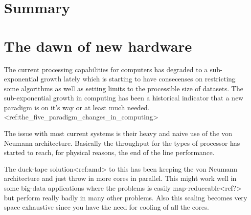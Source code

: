 \documentclass{article}
\begin{document}

%
% 


\section{Summary}

\section{The dawn of new hardware}
    The current processing capabilities for computers has degraded to a
    sub-exponential growth lately which is starting to have consecenses on
    restricting some algorithms as well as setting limits 
    to the processible size of datasets.
    The sub-exponential growth in computing has been a historical indicator
    that a new paradigm is on it's way or at least much
    needed.<ref:the_five_paradigm_changes_in_computing>
    
    The issue with most current systems is their heavy and naive use of the von
    Neumann architecture. Basically the throughput for the types of processor
    has started to reach, for physical reasons, the end of the line 
    performance.

    The duck-tape solution<ref:amd> to this has been keeping the von Neumann
    architecture and just throw in more cores in parallel.
    This might work well in some big-data applications where the problems is easily
    map-reduceable<ref?> but perform really badly in many other problems. Also
    this scaling becomes very space exhaustive since you have the need for
    cooling of all the cores.
\end{document}
